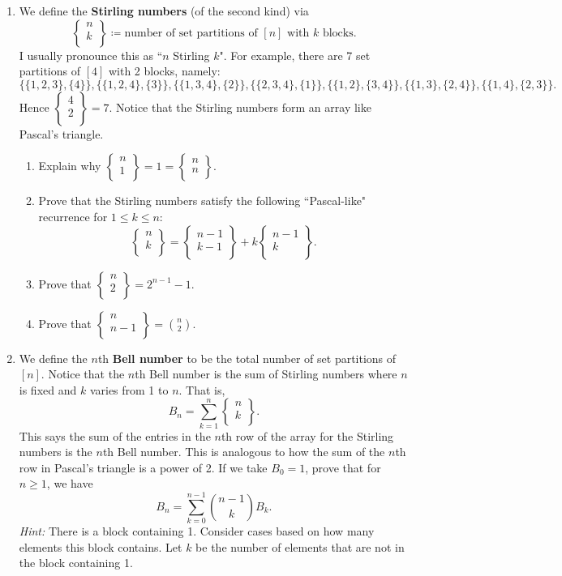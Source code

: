 \documentclass[11pt]{article}%
\theoremstyle{definition}
\newcommand{\stirling}[2]{
  \displaystyle \left\{\begin{matrix}#1  \\#2  \\ \end{matrix}\right\}}
\begin{document}
\begin{enumerate}

\item We define the \textbf{Stirling numbers} (of the second kind) via
\[
\stirling{n}{k}\coloneqq \text{number of set partitions of }[n]\text{ with }k\text{ blocks}.
\]
I usually pronounce this as ``$n$ Stirling $k$". For example, there are 7 set partitions of $[4]$ with 2 blocks, namely:
\[
\{\{1,2,3\},\{4\}\}, \{\{1,2,4\},\{3\}\}, \{\{1,3,4\},\{2\}\}, \{\{2,3,4\},\{1\}\}, \{\{1,2\},\{3,4\}\}, \{\{1,3\},\{2,4\}\}, \{\{1,4\},\{2,3\}\}.  
\]
Hence $\stirling{4}{2}=7$. Notice that the Stirling numbers form an array like Pascal's triangle. 
\begin{enumerate}
\item Explain why $\stirling{n}{1}=1=\stirling{n}{n}$.
\item Prove that the Stirling numbers satisfy the following ``Pascal-like" recurrence for $1\leq k\leq n$:
\[
\stirling{n}{k}=\stirling{n-1}{k-1}+k\stirling{n-1}{k}.
\]
\item Prove that $\stirling{n}{2}=2^{n-1}-1$.
\item Prove that $\stirling{n}{n-1}=\binom{n}{2}$.
\end{enumerate}

\item We define the $n$th \textbf{Bell number} to be the total number of set partitions of $[n]$.  Notice that the $n$th Bell number is the sum of Stirling numbers where $n$ is fixed and $k$ varies from 1 to $n$.  That is,
\[
B_n=\sum_{k=1}^n\stirling{n}{k}.
\]
This says the sum of the entries in the $n$th row of the array for the Stirling numbers is the $n$th Bell number.  This is analogous to how the sum of the $n$th row in Pascal's triangle is a power of 2. If we take $B_0=1$, prove that for $n\geq 1$, we have
\[
B_n=\sum_{k=0}^{n-1}\binom{n-1}{k}B_k.
\]
\emph{Hint:} There is a block containing 1. Consider cases based on how many elements this block contains. Let $k$ be the number of elements that are not in the block containing 1.


\end{enumerate}
\end{document}
